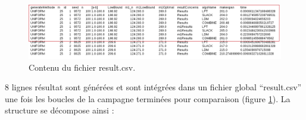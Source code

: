 \documentclass[a4paper,12pt]{report}
\theoremstyle{plain}				%
\theoremstyle{definition}				%
\begin{document}
\begin{figure}
{\centering
\includegraphics[width=\columnwidth]{contenuResultCSV.png}
\caption{Contenu du fichier result.csv.}
\label{fig:contenuResultCSV}
\par}
\end{figure}

8 lignes résultat sont générées et sont intégrées dans un fichier global ``result.csv'' une fois les boucles de la campagne terminées pour comparaison (figure \ref{fig:contenuResultCSV}). La structure se décompose ainsi :
\end{document}
